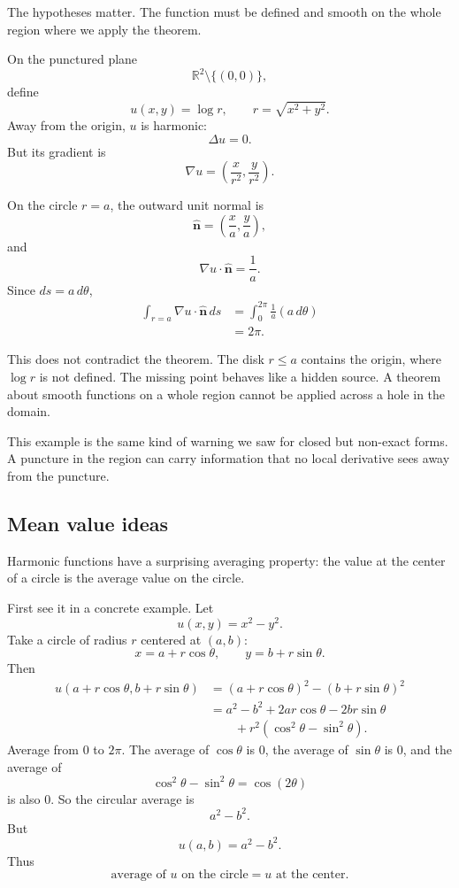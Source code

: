 The hypotheses matter.  The function must be defined and smooth on the whole region
where we apply the theorem.

\begin{example}
On the punctured plane
\[
    \mathbb R^2\setminus\{(0,0)\},
\]
define
\[
    u(x,y)=\log r,
    \qquad
    r=\sqrt{x^2+y^2}.
\]
Away from the origin, \(u\) is harmonic:
\[
    \Delta u=0.
\]
But its gradient is
\[
    \nabla u=\left(\frac{x}{r^2},\frac{y}{r^2}\right).
\]

On the circle \(r=a\), the outward unit normal is
\[
    \widehat{\mathbf n}=\left(\frac{x}{a},\frac{y}{a}\right),
\]
and
\[
    \nabla u\cdot\widehat{\mathbf n}
    =
    \frac{1}{a}.
\]
Since \(ds=a\,d\theta\),
\[
\begin{aligned}
    \int_{r=a}\nabla u\cdot\widehat{\mathbf n}\,ds
    &=
    \int_0^{2\pi}\frac1a(a\,d\theta)\\
    &=
    2\pi.
\end{aligned}
\]

This does not contradict the theorem.  The disk \(r\le a\) contains the origin, where
\(\log r\) is not defined.  The missing point behaves like a hidden source.  A theorem
about smooth functions on a whole region cannot be applied across a hole in the
domain.
\end{example}

This example is the same kind of warning we saw for closed but non-exact forms.  A
puncture in the region can carry information that no local derivative sees away from
the puncture.

\subsection{Mean value ideas}

Harmonic functions have a surprising averaging property: the value at the center of a
circle is the average value on the circle.

First see it in a concrete example.  Let
\[
    u(x,y)=x^2-y^2.
\]
Take a circle of radius \(r\) centered at \((a,b)\):
\[
    x=a+r\cos\theta,
    \qquad
    y=b+r\sin\theta.
\]
Then
\[
\begin{aligned}
u(a+r\cos\theta,b+r\sin\theta)
&=
(a+r\cos\theta)^2-(b+r\sin\theta)^2\\
&=
a^2-b^2
+2ar\cos\theta
-2br\sin\theta\\
&\qquad
+r^2(\cos^2\theta-\sin^2\theta).
\end{aligned}
\]
Average from \(0\) to \(2\pi\).  The average of \(\cos\theta\) is \(0\), the average of
\(\sin\theta\) is \(0\), and the average of
\[
    \cos^2\theta-\sin^2\theta=\cos(2\theta)
\]
is also \(0\).  So the circular average is
\[
    a^2-b^2.
\]
But
\[
    u(a,b)=a^2-b^2.
\]
Thus
\[
\boxed{
    \text{average of }u\text{ on the circle}=u\text{ at the center.}
}
\]

